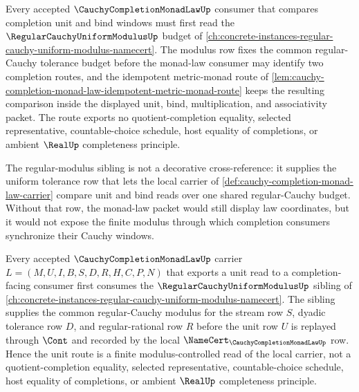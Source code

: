\begin{lemma}
\label{lem:cauchy-completion-monad-law-regular-cauchy-uniform-modulus-route}
Every accepted $\CauchyCompletionMonadLawUp$ consumer that compares completion unit and bind windows must first read the $\RegularCauchyUniformModulusUp$ budget of \autoref{ch:concrete-instances-regular-cauchy-uniform-modulus-namecert}. The modulus row fixes the common regular-Cauchy tolerance budget before the monad-law consumer may identify two completion routes, and the idempotent metric-monad route of \autoref{lem:cauchy-completion-monad-law-idempotent-metric-monad-route} keeps the resulting comparison inside the displayed unit, bind, multiplication, and associativity packet. The route exports no quotient-completion equality, selected representative, countable-choice schedule, host equality of completions, or ambient $\RealUp$ completeness principle.
\end{lemma}

The regular-modulus sibling is not a decorative cross-reference: it supplies the uniform tolerance row that lets the local carrier of \autoref{def:cauchy-completion-monad-law-carrier} compare unit and bind reads over one shared regular-Cauchy budget. Without that row, the monad-law packet would still display law coordinates, but it would not expose the finite modulus through which completion consumers synchronize their Cauchy windows.

\begin{theorem}
\label{thm:cauchy-completion-monad-law-regular-modulus-unit}
Every accepted $\CauchyCompletionMonadLawUp$ carrier $L=(M,U,I,B,S,D,R,H,C,P,N)$ that exports a unit read to a completion-facing consumer first consumes the $\RegularCauchyUniformModulusUp$ sibling of \autoref{ch:concrete-instances-regular-cauchy-uniform-modulus-namecert}. The sibling supplies the common regular-Cauchy modulus for the stream row $S$, dyadic tolerance row $D$, and regular-rational row $R$ before the unit row $U$ is replayed through $\Cont$ and recorded by the local $\NameCert_{\CauchyCompletionMonadLawUp}$ row. Hence the unit route is a finite modulus-controlled read of the local carrier, not a quotient-completion equality, selected representative, countable-choice schedule, host equality of completions, or ambient $\RealUp$ completeness principle.
\end{theorem}

